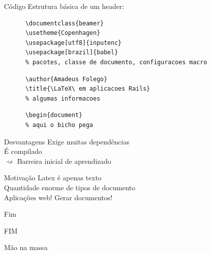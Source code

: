 \documentclass{beamer}
\begin{document}
  \begin{frame}[fragile]{Código}
    Estrutura básica de um header:
    \begin{verbatim}
      \documentclass{beamer}
      \usetheme{Copenhagen}
      \usepackage[utf8]{inputenc}
      \usepackage[brazil]{babel}
      % pacotes, classe de documento, configuracoes macro
    \end{verbatim}
    \pause\begin{verbatim}
      \author{Amadeus Folego}
      \title{\LaTeX\ em aplicacoes Rails}
      % algumas informacoes
    \end{verbatim}
    \pause\begin{verbatim}
      \begin{document}
      % aqui o bicho pega
    \end{verbatim}
\end{frame}
  \begin{frame}{Desvantagens}
     Exige muitas dependências\\\pause
    \onslide<2->{ $ \rightsquigarrow $ } É compilado\\\pause
     Barreira inicial de aprendizado
  \end{frame}
  \begin{frame}{Motivação} 
    \onslide<1>{$ \nabla $} Latex é apenas texto\\\pause
     Quantidade enorme de tipos de documento\\\pause
     Aplicações web! Gerar documentos!\\
  \end{frame}
  \begin{frame}{Fim} 
    \begin{center} \selectfont \Huge FIM \end{center}
  \end{frame}
  \begin{frame}{Mão na massa} 
    \begin{center} \href{https://github.com/jacott/rails-latex}{} \end{center}
  \end{frame}
  \begin{frame}[plain] 
    \titlepage
  \end{frame}
\end{document}
